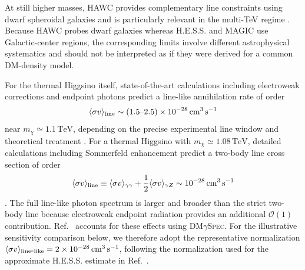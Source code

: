 \documentclass[aps,prd,reprint,superscriptaddress,nofootinbib,longbibliography,floatfix]{revtex4-2}
\newcommand{\TeV}{\mathrm{TeV}}
\begin{document}
At still higher masses, HAWC provides complementary line constraints using dwarf spheroidal galaxies and is particularly relevant in the multi-TeV regime \cite{HAWC2020Lines}. Because HAWC probes dwarf galaxies whereas H.E.S.S. and MAGIC use Galactic-center regions, the corresponding limits involve different astrophysical systematics and should not be interpreted as if they were derived for a common DM-density model.

For the thermal Higgsino itself, state-of-the-art calculations including electroweak corrections and endpoint photons predict a line-like annihilation rate of order
\begin{equation}
\langle\sigma v\rangle_{\rm line}
\sim(1.5\text{--}2.5)\times10^{-28}\,\mathrm{cm^3\,s^{-1}}
\end{equation}
near $m_\chi\simeq1.1\,\TeV$, depending on the precise experimental line window and theoretical treatment \cite{Beneke2020Higgsino,Rodd2024}. %
For a thermal Higgsino with $m_\chi\simeq1.08\,\TeV$, detailed calculations
including Sommerfeld enhancement predict a two-body line cross section of
order
\begin{equation}
\langle\sigma v\rangle_{\rm line}
\equiv
\langle\sigma v\rangle_{\gamma\gamma}
+
\frac{1}{2}
\langle\sigma v\rangle_{\gamma Z}
\sim
10^{-28}\,\mathrm{cm^3\,s^{-1}}
\end{equation}
\cite{Rodd2024}. The full line-like photon spectrum is larger and broader
than the strict two-body line because electroweak endpoint radiation provides
an additional $\mathcal{O}(1)$ contribution. Ref.~\cite{Rodd2024} accounts
for these effects using \textsc{DM}$\gamma$\textsc{Spec}. For the
illustrative sensitivity comparison below, we therefore adopt the
representative normalization
$\langle\sigma v\rangle_{\rm line\mbox{-}like}
=2\times10^{-28}\,\mathrm{cm^3\,s^{-1}}$, following the normalization used
for the approximate H.E.S.S. estimate in Ref.~\cite{Rodd2024}.
\end{document}
